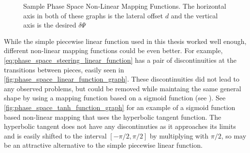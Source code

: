 \begin{figure}
\centering
{}
\hfill
{}
\caption[Sample Phase Space Non-Linear Mapping Functions]{Sample Phase Space Non-Linear Mapping Functions. The horizontal axis in both of these graphs is the lateral offset $d$ and the vertical axis is the desired $\delta\Psi$}
\label{fig:phase_space_sample_function_graphs}
\end{figure}

While the simple piecewise linear function used in this thesis worked well enough, different non-linear mapping functions could be even better. For example, \eqref{eq:phase_space_steering_linear_function} has a pair of discontinuities at the transitions between pieces, easily seen in \autoref{fig:phase_space_linear_function_graph}. These discontinuities did not lead to any observed problems, but could be removed while maintaing the same general shape by using a mapping function based on a sigmoid function (see ). See \autoref{fig:phase_space_tanh_function_graph} for an example of a sigmoid function based non-linear mapping that uses the hyperbolic tangent function. The hyperbolic tangent does not have any discontinuties as it approaches its limits and is easily shifted to the interval $\left[-\pi/2,\pi/2\right]$ by multiplying with $\pi/2$, so may be an attractive alternative to the simple piecewise linear function.

